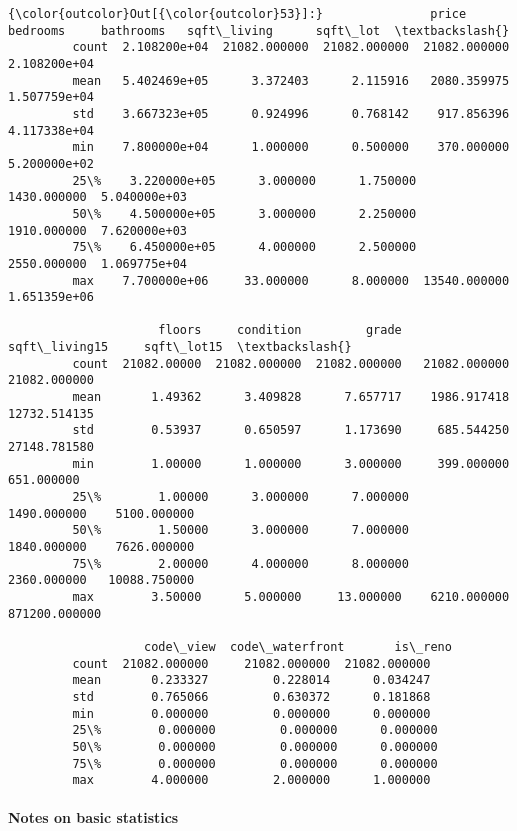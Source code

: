 \documentclass[11pt]{article}
\begin{document}
\begin{Verbatim}[commandchars=\\\{\}]
{\color{outcolor}Out[{\color{outcolor}53}]:}               price      bedrooms     bathrooms   sqft\_living      sqft\_lot  \textbackslash{}
         count  2.108200e+04  21082.000000  21082.000000  21082.000000  2.108200e+04   
         mean   5.402469e+05      3.372403      2.115916   2080.359975  1.507759e+04   
         std    3.667323e+05      0.924996      0.768142    917.856396  4.117338e+04   
         min    7.800000e+04      1.000000      0.500000    370.000000  5.200000e+02   
         25\%    3.220000e+05      3.000000      1.750000   1430.000000  5.040000e+03   
         50\%    4.500000e+05      3.000000      2.250000   1910.000000  7.620000e+03   
         75\%    6.450000e+05      4.000000      2.500000   2550.000000  1.069775e+04   
         max    7.700000e+06     33.000000      8.000000  13540.000000  1.651359e+06   
         
                     floors     condition         grade  sqft\_living15     sqft\_lot15  \textbackslash{}
         count  21082.00000  21082.000000  21082.000000   21082.000000   21082.000000   
         mean       1.49362      3.409828      7.657717    1986.917418   12732.514135   
         std        0.53937      0.650597      1.173690     685.544250   27148.781580   
         min        1.00000      1.000000      3.000000     399.000000     651.000000   
         25\%        1.00000      3.000000      7.000000    1490.000000    5100.000000   
         50\%        1.50000      3.000000      7.000000    1840.000000    7626.000000   
         75\%        2.00000      4.000000      8.000000    2360.000000   10088.750000   
         max        3.50000      5.000000     13.000000    6210.000000  871200.000000   
         
                   code\_view  code\_waterfront       is\_reno  
         count  21082.000000     21082.000000  21082.000000  
         mean       0.233327         0.228014      0.034247  
         std        0.765066         0.630372      0.181868  
         min        0.000000         0.000000      0.000000  
         25\%        0.000000         0.000000      0.000000  
         50\%        0.000000         0.000000      0.000000  
         75\%        0.000000         0.000000      0.000000  
         max        4.000000         2.000000      1.000000  
\end{Verbatim}
            
    \hypertarget{notes-on-basic-statistics}{%
\paragraph{Notes on basic statistics}\label{notes-on-basic-statistics}}
\end{document}
